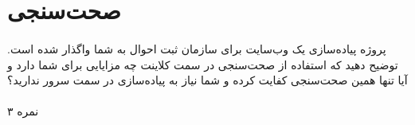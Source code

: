 \documentclass[../main.tex]{subfiles}
\begin{document}
\section{صحت‌سنجی}

\paragraph{}
پروژه پیاده‌سازی یک وب‌سایت برای سازمان ثبت احوال به شما واگذار شده است.
توضیح دهید که استفاده از صحت‌سنجی در سمت کلاینت چه مزایایی برای شما دارد و آیا تنها همین صحت‌سنجی کفایت کرده و شما نیاز به پیاده‌سازی در سمت سرور ندارید؟

\paragraph{}
۳ نمره
\end{document}
